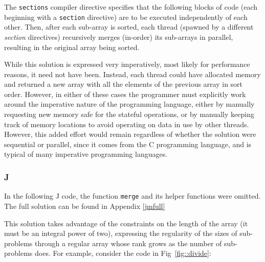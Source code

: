 \noindent The \texttt{sections} compiler directive
specifies that the following blocks of code (each beginning with a \texttt{section} directive) 
are to be executed independently of each other\cite{openmp}. 
Then, after each sub-array is sorted, each thread (spawned by a different \textit{section} directives) 
recursively merges (in-order) its sub-arrays in parallel, resulting in the original array being sorted.

While this solution is expressed very imperatively, most likely for performance reasons, it need not have been. 
Instead, each thread could have allocated memory and returned a new array with all the elements of the previous array in sort order.
However, in either of these cases the programmer must explicitly work around the 
imperative nature of the programming language, either by manually requesting new memory safe for the stateful operations, 
or by manually keeping track of memory locations to avoid operating on data in use by other threads.
However, this added effort would remain regardless of whether the solution were sequential or parallel, 
since it comes from the C programming language, and is typical of many imperative programming languages.

\subsubsection{J}
\label{jmerge}
In the following J code, the function \texttt{merge} and its helper functions were omitted.
The full solution can be found in Appendix \ref{jmfull}

\begin{singlespacing}
\begin{small}

\end{small}
\end{singlespacing}

\noindent This solution takes advantage of the constraints on the length of the array (it must be an integral power of two), 
expressing the regularity of the sizes of sub-problems through a regular array 
whose rank grows as the number of sub-problems does.
For example, consider the code in Fig~\ref{fig::divide}: 

